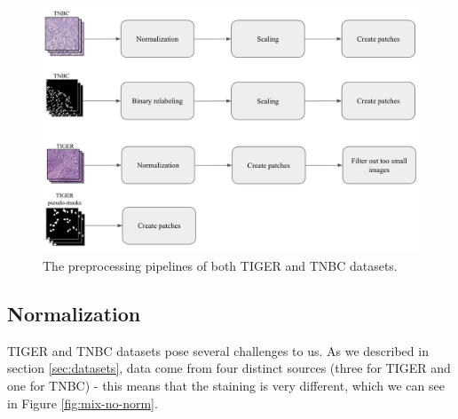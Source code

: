 \begin{figure}[H]
\begin{centering}
\includegraphics[width=\textwidth]{assets/images/for_presentation/dg-preprocessing.png}
\par\end{centering}
\caption{The preprocessing pipelines of both TIGER and TNBC datasets.
\label{fig:dg-preprocessing}}
\end{figure}

\subsection{Normalization} 
TIGER and TNBC datasets pose several challenges to us. As we described in section \ref{sec:datasets}, data come from four distinct sources (three for TIGER and one for TNBC) - this means that the staining is very different, which we can see in Figure \ref{fig:mix-no-norm}.

